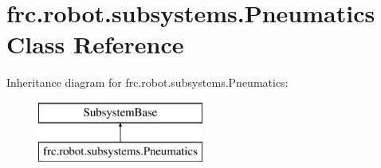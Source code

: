 \hypertarget{classfrc_1_1robot_1_1subsystems_1_1_pneumatics}{}\section{frc.\+robot.\+subsystems.\+Pneumatics Class Reference}
\label{classfrc_1_1robot_1_1subsystems_1_1_pneumatics}
Inheritance diagram for frc.\+robot.\+subsystems.\+Pneumatics\+:\begin{figure}[H]
\begin{center}
\leavevmode
\includegraphics[height=2.000000cm]{classfrc_1_1robot_1_1subsystems_1_1_pneumatics}
\end{center}
\end{figure}
